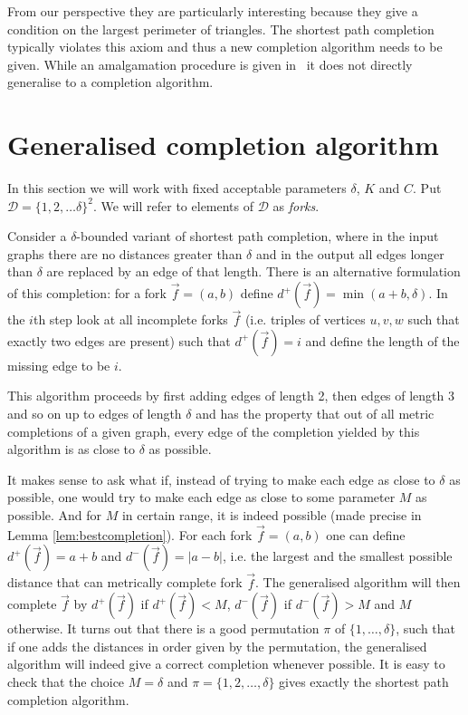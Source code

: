 \documentclass[11pt]{amsart}
\begin{document}
From our perspective they are particularly interesting because they give a condition on the
largest perimeter of triangles. The shortest path completion typically violates this axiom and thus a new completion algorithm needs to be given.
While an amalgamation procedure is given in~\cite{Cherlin2013} it does not directly
generalise to a completion algorithm.

\section{Generalised completion algorithm}
\label{sec:algorithm}
In this section we will work with fixed acceptable parameters $\delta$, $K$ and $C$.  Put $\mathcal D=\{1,2,\dots \delta\}^2$. We will refer to elements of $\mathcal D$ as {\em forks}.

Consider a $\delta$-bounded variant of shortest path completion, where in the input graphs there are no distances greater than $\delta$ and in the output all edges longer than $\delta$ are replaced by an edge of that length. There is an alternative formulation of this completion: for a fork $\vec{f}=(a,b)$ define $d^+(\vec{f})=\min(a+b,\delta)$. In the $i$th step look at all incomplete forks $\vec{f}$ (i.e. triples of vertices $u,v,w$ such that exactly two edges are present) such that $d^+(\vec{f}) = i$ and define the length of the missing edge to be $i$.

This algorithm proceeds by first adding edges of length 2, then edges of length 3 and so on up to edges of length $\delta$ and has the property that out of all metric completions of a given graph, every edge of the completion yielded by this algorithm is as close to $\delta$ as possible.

It makes sense to ask what if, instead of trying to make each edge as close to $\delta$ as possible, one would try to make each edge as close to some parameter $M$ as possible. And for $M$ in certain range, it is indeed possible (made precise in Lemma \ref{lem:bestcompletion}). For each fork $\vec{f}=(a,b)$ one can define $d^+(\vec{f}) = a+b$ and $d^-(\vec{f}) = |a-b|$, i.e. the largest and the smallest possible distance that can metrically complete fork $\vec{f}$. The generalised algorithm will then complete $\vec{f}$ by $d^+(\vec{f})$ if $d^+(\vec{f})<M$, $d^-(\vec{f})$ if $d^-(\vec{f})>M$ and $M$ otherwise. It turns out that there is a good permutation $\pi$ of $\{1,\dots,\delta\}$, such that if one adds the distances in order given by the permutation, the generalised algorithm will indeed give a correct completion whenever possible. It is easy to check that the choice $M=\delta$ and $\pi=\{1,2,\dots,\delta\}$ gives exactly the shortest path completion algorithm.
\end{document}
